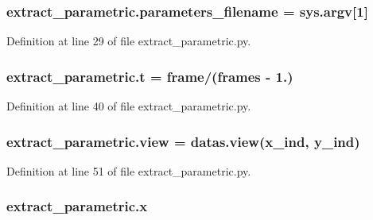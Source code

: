 \subsubsection[{\texorpdfstring{parameters\+\_\+filename}{parameters_filename}}]{\setlength{\rightskip}{0pt plus 5cm}extract\+\_\+parametric.\+parameters\+\_\+filename = sys.\+argv\mbox{[}1\mbox{]}}\hypertarget{namespaceextract__parametric_a0eb7a97525953d846466d58d2a35175b}{}\label{namespaceextract__parametric_a0eb7a97525953d846466d58d2a35175b}


Definition at line 29 of file extract\+\_\+parametric.\+py.

\subsubsection[{\texorpdfstring{t}{t}}]{\setlength{\rightskip}{0pt plus 5cm}extract\+\_\+parametric.\+t = frame/({\bf frames} -\/ 1.)}\hypertarget{namespaceextract__parametric_a730b851f64e77467557fbc820239405a}{}\label{namespaceextract__parametric_a730b851f64e77467557fbc820239405a}


Definition at line 40 of file extract\+\_\+parametric.\+py.

\subsubsection[{\texorpdfstring{view}{view}}]{\setlength{\rightskip}{0pt plus 5cm}extract\+\_\+parametric.\+view = datas.\+view({\bf x\+\_\+ind}, {\bf y\+\_\+ind})}\hypertarget{namespaceextract__parametric_a71563aa31bfb99f2393aeadc66797e54}{}\label{namespaceextract__parametric_a71563aa31bfb99f2393aeadc66797e54}


Definition at line 51 of file extract\+\_\+parametric.\+py.

\subsubsection[{\texorpdfstring{x}{x}}]{\setlength{\rightskip}{0pt plus 5cm}extract\+\_\+parametric.\+x}\hypertarget{namespaceextract__parametric_ab6f1cb05726babc5a8a23423bb0771ea}{}\label{namespaceextract__parametric_ab6f1cb05726babc5a8a23423bb0771ea}


